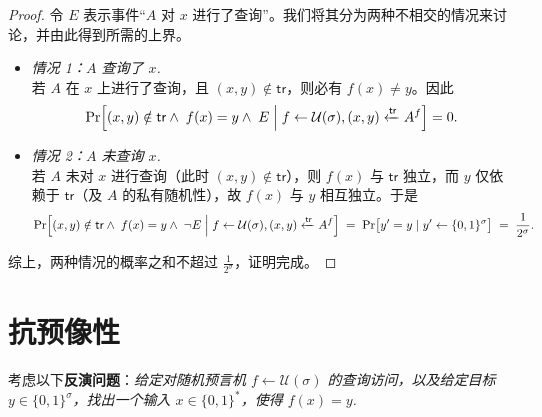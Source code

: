 \documentclass[american,singlepageview]{snargs-book-zh}
\newcommand{\Bits}{\{0,1\}}
\newcommand{\Event}{E}
\newcommand{\ProtoAdversary}{A}
\newcommand{\ROFunction}{f}
\newcommand{\RODistribution}[1]{\mathcal{U}(#1)}
\newcommand{\ROOutputAndTrace}[4]{#4 \xleftarrow{#3} {#2}^{#1}}
\newcommand{\ROQuery}{x}
\newcommand{\ROAnswer}{y}
\newcommand{\ROTrace}{\mathsf{tr}}
\newcommand{\ROAdversary}{\ProtoAdversary}
\newcommand{\ROOutputSize}{\sigma}
\newcommand{\ROPExpression}[1]{\frac{1}{2^{#1}}}
\begin{document}
\begin{proof}
令 $\Event$ 表示事件“$\ROAdversary$ 对 $\ROQuery$ 进行了查询”。我们将其分为两种不相交的情况来讨论，并由此得到所需的上界。
\begin{itemize}
  \item \emph{情况 1：$\ROAdversary$ 查询了 $\ROQuery$.}\\
    若 $\ROAdversary$ 在 $\ROQuery$ 上进行了查询，且 $(\ROQuery,\ROAnswer)\notin\ROTrace$，则必有 $\ROFunction(\ROQuery)\neq\ROAnswer$。因此
\[
\Pr\Bigl[
(\ROQuery,\ROAnswer)\notin\ROTrace
\land\;\ROFunction(\ROQuery)=\ROAnswer
\land\;\Event
\;\Big|\;
\ROFunction\gets\RODistribution{\ROOutputSize},
\ROOutputAndTrace{\ROFunction}{\ROAdversary}{\ROTrace}{(\ROQuery,\ROAnswer)}
\Bigr]
=0.
\]

  \item \emph{情况 2：$\ROAdversary$ 未查询 $\ROQuery$.}\\
    若 $\ROAdversary$ 未对 $\ROQuery$ 进行查询（此时 $(\ROQuery,\ROAnswer)\notin\ROTrace$），则 $\ROFunction(\ROQuery)$ 与 $\ROTrace$ 独立，而 $\ROAnswer$ 仅依赖于 $\ROTrace$（及 $\ROAdversary$ 的私有随机性），故 $\ROFunction(\ROQuery)$ 与 $\ROAnswer$ 相互独立。于是
\[
\Pr\Bigl[
(\ROQuery,\ROAnswer)\notin\ROTrace
\land\;\ROFunction(\ROQuery)=\ROAnswer
\land\;\neg\Event
\;\Big|\;
\ROFunction\gets\RODistribution{\ROOutputSize},
\ROOutputAndTrace{\ROFunction}{\ROAdversary}{\ROTrace}{(\ROQuery,\ROAnswer)}
\Bigr]
\;=\;
\Pr\bigl[\ROAnswer'=\ROAnswer\mid\ROAnswer'\gets\Bits^{\ROOutputSize}\bigr]
\;=\;
\ROPExpression{\ROOutputSize}.
\]
\end{itemize}
综上，两种情况的概率之和不超过 $\ROPExpression{\ROOutputSize}$，证明完成。
\end{proof}


\section{抗预像性}
\label{section:inversion-resistance}

考虑以下\textbf{反演问题}：\emph{给定对随机预言机 $\ROFunction \gets \RODistribution{\ROOutputSize}$ 的查询访问，以及给定目标 $\ROAnswer \in \Bits^{\ROOutputSize}$，找出一个输入 $\ROQuery \in \Bits^{*}$，使得 $\ROFunction(\ROQuery)=\ROAnswer$.}
\end{document}

